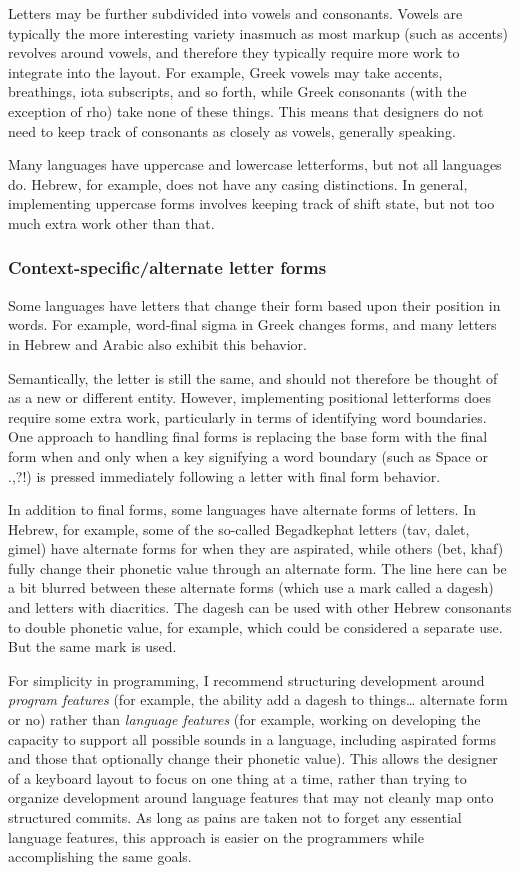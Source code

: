 \documentclass[11pt]{article}
\begin{document}
Letters may be further subdivided into vowels and consonants. Vowels are typically the more interesting variety inasmuch as most markup (such as accents) revolves around vowels, and therefore they typically require more work to integrate into the layout. For example, Greek vowels may take accents, breathings, iota subscripts, and so forth, while Greek consonants (with the exception of rho) take none of these things. This means that designers do not need to keep track of consonants as closely as vowels, generally speaking.

Many languages have uppercase and lowercase letterforms, but not all languages do. Hebrew, for example, does not have any casing distinctions. In general, implementing uppercase forms involves keeping track of shift state, but not too much extra work other than that.

\subsubsection{Context-specific/alternate letter forms}
\label{sec:org3f3a9f9}

Some languages have letters that change their form based upon their position in words. For example, word-final sigma in Greek changes forms, and many letters in Hebrew and Arabic also exhibit this behavior.

Semantically, the letter is still the same, and should not therefore be thought of as a new or different entity. However, implementing positional letterforms does require some extra work, particularly in terms of identifying word boundaries. One approach to handling final forms is replacing the base form with the final form when and only when a key signifying a word boundary (such as Space or .,?!) is pressed immediately following a letter with final form behavior.

In addition to final forms, some languages have alternate forms of letters. In Hebrew, for example, some of the so-called Begadkephat letters (tav, dalet, gimel) have alternate forms for when they are aspirated, while others (bet, khaf) fully change their phonetic value through an alternate form. The line here can be a bit blurred between these alternate forms (which use a mark called a dagesh) and letters with diacritics. The dagesh can be used with other Hebrew consonants to double phonetic value, for example, which could be considered a separate use. But the same mark is used.

For simplicity in programming, I recommend structuring development around \emph{program features} (for example, the ability add a dagesh to things\ldots{} alternate form or no) rather than \emph{language features} (for example, working on developing the capacity to support all possible sounds in a language, including aspirated forms and those that optionally change their phonetic value). This allows the designer of a keyboard layout to focus on one thing at a time, rather than trying to organize development around language features that may not cleanly map onto structured commits. As long as pains are taken not to forget any essential language features, this approach is easier on the programmers while accomplishing the same goals.
\end{document}
